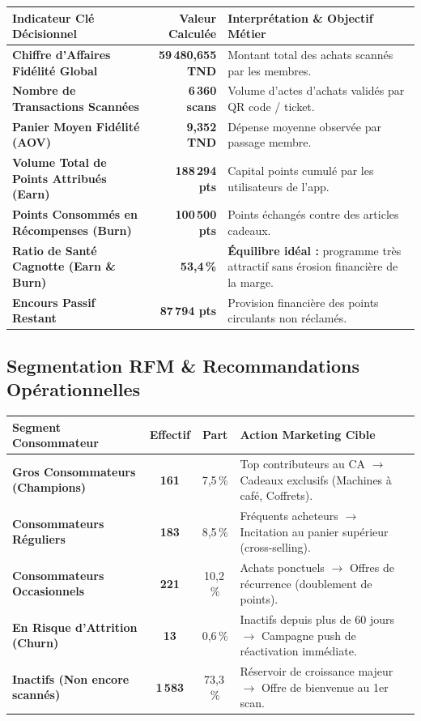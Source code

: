 \documentclass[11pt,a4paper]{article}
\begin{document}
\vspace{0.2cm}
\noindent
\begin{tabularx}{\textwidth}{p{6.5cm} r X}
\toprule
\rowcolor{tableheader}
\textbf{Indicateur Clé Décisionnel} & \textbf{Valeur Calculée} & \textbf{Interprétation \& Objectif Métier} \\
\midrule
\textbf{Chiffre d'Affaires Fidélité Global} & \textbf{59\,480,655 TND} & Montant total des achats scannés par les membres. \\
\textbf{Nombre de Transactions Scannées} & \textbf{6\,360 scans} & Volume d'actes d'achats validés par QR code / ticket. \\
\textbf{Panier Moyen Fidélité (AOV)} & \textbf{9,352 TND} & Dépense moyenne observée par passage membre. \\
\textbf{Volume Total de Points Attribués (Earn)} & \textbf{188\,294 pts} & Capital points cumulé par les utilisateurs de l'app. \\
\textbf{Points Consommés en Récompenses (Burn)} & \textbf{100\,500 pts} & Points échangés contre des articles cadeaux. \\
\textbf{Ratio de Santé Cagnotte (Earn \& Burn)} & \textbf{53,4\,\%} & \textbf{Équilibre idéal :} programme très attractif sans érosion financière de la marge. \\
\textbf{Encours Passif Restant} & \textbf{87\,794 pts} & Provision financière des points circulants non réclamés. \\
\bottomrule
\end{tabularx}

\vspace{0.5cm}

\subsection*{\textcolor{fidnessblue}{Segmentation RFM \& Recommandations Opérationnelles}}

\vspace{0.1cm}
\noindent
\begin{tabularx}{\textwidth}{p{4.5cm} c c X}
\toprule
\rowcolor{tableheader}
\textbf{Segment Consommateur} & \textbf{Effectif} & \textbf{Part} & \textbf{Action Marketing Cible} \\
\midrule
\textbf{Gros Consommateurs (Champions)} & \textbf{161} & 7,5\,\% & Top contributeurs au CA $\rightarrow$ Cadeaux exclusifs (Machines à café, Coffrets). \\
\textbf{Consommateurs Réguliers} & \textbf{183} & 8,5\,\% & Fréquents acheteurs $\rightarrow$ Incitation au panier supérieur (cross-selling). \\
\textbf{Consommateurs Occasionnels} & \textbf{221} & 10,2\,\% & Achats ponctuels $\rightarrow$ Offres de récurrence (doublement de points). \\
\textbf{En Risque d'Attrition (Churn)} & \textbf{13} & 0,6\,\% & Inactifs depuis plus de 60 jours $\rightarrow$ Campagne push de réactivation immédiate. \\
\textbf{Inactifs (Non encore scannés)} & \textbf{1\,583} & 73,3\,\% & Réservoir de croissance majeur $\rightarrow$ Offre de bienvenue au 1er scan. \\
\bottomrule
\end{tabularx}
\end{document}
